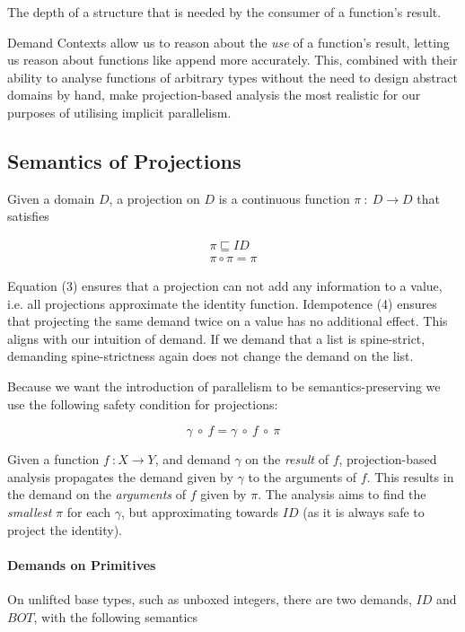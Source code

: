            {The depth of a structure that is needed by the consumer of a
            function's result.}

Demand Contexts allow us to reason about the \emph{use} of a function's result,
letting us reason about functions like \<append\> more accurately. This, combined
with their ability to analyse functions of arbitrary types without the need to
design abstract domains by hand, make projection-based analysis the most
realistic for our purposes of utilising implicit parallelism.

\subsection{Semantics of Projections}
\label{sec:projSem}

Given a domain $D$, a projection on $D$ is a continuous function
$\pi \ : \ D \rightarrow D$ that satisfies

\begin{align}
\pi \sqsubseteq ID \\
\pi \circ \pi = \pi
\end{align}

Equation (3) ensures that a projection can not add any information to a value,
i.e. all projections approximate the identity function. Idempotence (4) ensures
that projecting the same demand twice on a value has no additional effect. This
aligns with our intuition of demand. If we demand that a list is spine-strict,
demanding spine-strictness again does not change the demand on the list.

Because we want the introduction of parallelism to be semantics-preserving we
use the following safety condition for projections:

\begin{equation}
\gamma \ \circ \ f = \gamma \ \circ \ f \ \circ \ \pi
\end{equation}

Given a function $f \ : X \rightarrow Y$, and demand $\gamma$ on the
\emph{result} of $f$, projection-based analysis propagates the demand given by
$\gamma$ to the arguments of $f$. This results in the demand on the
\emph{arguments} of $f$ given by $\pi$.  The analysis aims to find the
\emph{smallest} $\pi$ for each $\gamma$, but approximating towards $ID$ (as
it is always safe to project the identity).

\paragraph{Demands on Primitives}
On unlifted base types, such as unboxed integers, there are two demands,
$ID$ and $BOT$, with the following semantics


